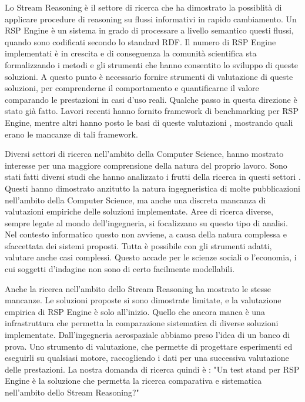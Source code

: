 Lo Stream Reasoning \`e  il settore di ricerca che ha dimostrato la possiblit\`a di applicare procedure di reasoning su flussi informativi in rapido cambiamento. Un RSP Engine \`e  un sistema in grado di processare a livello semantico questi flussi, quando sono codificati secondo lo standard RDF. Il numero di RSP Engine implementati \`e  in crescita e di conseguenza la comunit\`a scientifica sta formalizzando i metodi e gli strumenti che hanno consentito lo sviluppo di queste soluzioni. A questo punto \`e  necessario fornire strumenti di valutazione di queste soluzioni, per comprenderne il comportamento e quantificarne il valore comparando le prestazioni in casi d'uso reali. 
Qualche passo in questa direzione \`e  stato gi\`a fatto. Lavori recenti \cite{Zhang2012, LePhuoc2012c, DBLP:conf/semweb/DellAglioCBCV13} hanno fornito framework di benchmarking per RSP Engine, mentre altri hanno posto le basi di queste valutazioni \cite{DBLP:conf/esws/ScharrenbachUMVB13}, mostrando quali erano le mancanze di tali framework.

Diversi settori di ricerca nell'ambito della Computer Science, hanno mostrato interesse per una maggiore comprensione della natura del proprio lavoro. Sono stati fatti diversi studi che hanno analizzato i frutti della ricerca in questi settori \cite{Tichy:1995:EEC:209090.209093, Wainer:2009:EEC:1518331.1518552}. Questi hanno dimostrato anzitutto la natura ingegneristica di molte pubblicazioni nell'ambito della Computer Science, ma anche una discreta mancanza di valutazioni empiriche delle soluzioni implementate. Aree di ricerca diverse, sempre legate al mondo dell'ingegneria, si focalizzano su questo tipo di analisi. Nel contesto informatico questo non avviene, a causa della natura complessa e sfaccettata dei sistemi proposti. Tutta \`e  possibile con gli strumenti adatti, valutare anche casi complessi. Questo accade per le scienze sociali o l'economia, i cui soggetti d'indagine non sono di certo facilmente modellabili.

Anche la ricerca nell'ambito dello Stream Reasoning ha mostrato le stesse mancanze. Le soluzioni proposte si sono dimostrate limitate, e la valutazione empirica di RSP Engine \`e  solo all'inizio. Quello che ancora manca \`e  una infrastruttura che permetta la comparazione sistematica di diverse soluzioni implementate. Dall'ingegneria aerospaziale abbiamo preso l'idea di un banco di prova. Uno strumento di valutazione, che permette di progettare esperimenti ed eseguirli su qualsiasi motore, raccogliendo i dati per una successiva valutazione delle prestazioni. %
La nostra domanda di ricerca quindi \`e : "Un test stand per RSP Engine \`e  la soluzione che permetta la ricerca comparativa e sistematica nell'ambito dello Stream Reasoning?"

